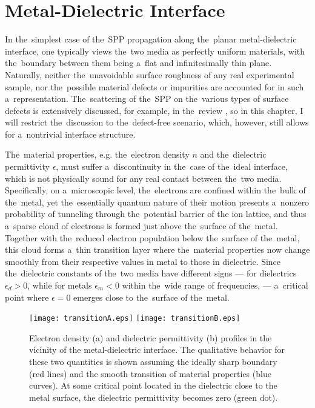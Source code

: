 \section{Metal-Dielectric Interface}

In the~simplest case of the~SPP propagation along the~planar metal-dielectric interface, one typically views the~two media as perfectly uniform materials, with the~boundary between them being a~flat and infinitesimally thin plane.
Naturally, neither the~unavoidable surface roughness of any real experimental sample, nor the~possible material defects or impurities are accounted for in such a~representation. 
The~scattering of the~SPP on the~various types of surface defects is extensively discussed, for example, in the~review \cite{zayats}, so in this chapter, I will restrict the~discussion to the~defect-free scenario, which, however, still allows for a~nontrivial interface structure.

The~material properties, e.g. the~electron density $n$ and the~dielectric permittivity $\epsilon$, must suffer a~discontinuity in the~case of the~ideal interface, which is not physically sound for any real contact between the~two media.
Specifically, on a~microscopic level, the~electrons are confined within the~bulk of the~metal, yet the~essentially quantum nature of their motion presents a~nonzero probability of tunneling through the~potential barrier of the ion lattice, and thus a~sparse cloud of electrons is formed just above the~surface of the~metal.
Together with the~reduced electron population below the~surface of the~metal, this cloud forms a~thin transition layer where the~material properties now change smoothly from their respective values in metal to those in dielectric.
Since the~dielectric constants of the~two media have different signs --- for dielectrics $\epsilon_d > 0$, while for metals $\epsilon_m < 0$ within the~wide range of frequencies, --- a~critical point where $\epsilon = 0$ emerges close to the~surface of the~metal.

\begin{figure}
\texttt{[image: transitionA.eps]}
\texttt{[image: transitionB.eps]}
\caption{Electron density (a) and dielectric permittivity (b) profiles in the vicinity of the metal-dielectric interface. The qualitative behavior for these two quantities is shown assuming the ideally sharp boundary (red lines) and the smooth transition of material properties (blue curves). At some critical point located in the dielectric close to the metal surface, the dielectric permittivity becomes zero (green dot).}
\label{fig:profilePlasmon}
\end{figure}

